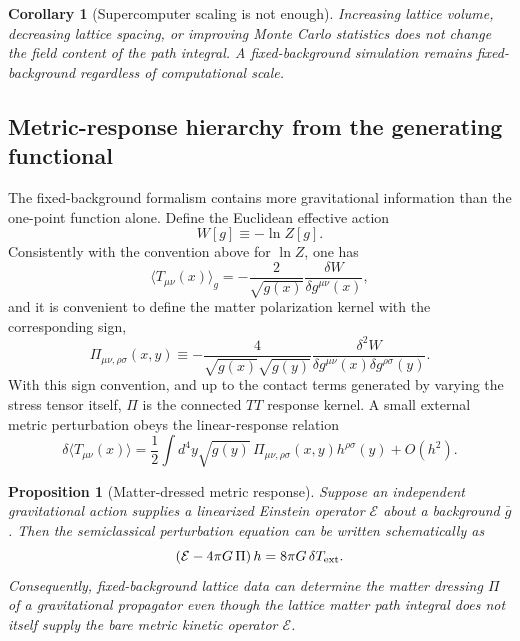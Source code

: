 \documentclass[11pt]{article}
\newtheorem{proposition}{Proposition}
\newtheorem{corollary}{Corollary}
\theoremstyle{remark}
\begin{document}
\begin{corollary}[Supercomputer scaling is not enough]
Increasing lattice volume, decreasing lattice spacing, or improving Monte Carlo statistics does not change the field content of the path integral. A fixed-background simulation remains fixed-background regardless of computational scale.
\end{corollary}


\subsection{Metric-response hierarchy from the generating functional}
The fixed-background formalism contains more gravitational information than the one-point function alone. Define the Euclidean effective action
\begin{equation}
 W[g]\equiv-\ln Z[g].
\end{equation}
Consistently with the convention above for $\ln Z$, one has
\begin{equation}
 \langle T_{\mu\nu}(x)\rangle_g
 =-\frac{2}{\sqrt{g(x)}}\frac{\delta W}{\delta g^{\mu\nu}(x)},
 \label{eq:lqcd-onepoint}
\end{equation}
and it is convenient to define the matter polarization kernel with the corresponding sign,
\begin{equation}
 \Pi_{\mu\nu,\rho\sigma}(x,y)
 \equiv
 -\frac{4}{\sqrt{g(x)}\sqrt{g(y)}}
 \frac{\delta^2W}
 {\delta g^{\mu\nu}(x)\delta g^{\rho\sigma}(y)}.
 \label{eq:lqcd-polarization}
\end{equation}
With this sign convention, and up to the contact terms generated by varying the stress tensor itself, $\Pi$ is the connected $TT$ response kernel. A small external metric perturbation obeys the linear-response relation
\begin{equation}
 \delta\langle T_{\mu\nu}(x)\rangle
 =\frac12\int d^4y\sqrt{g(y)}\,
 \Pi_{\mu\nu,\rho\sigma}(x,y)h^{\rho\sigma}(y)
 +O(h^2).
 \label{eq:lqcd-linear-response}
\end{equation}

\begin{proposition}[Matter-dressed metric response]
Suppose an independent gravitational action supplies a linearized Einstein operator $\mathcal E$ about a background $\bar g$. Then the semiclassical perturbation equation can be written schematically as
\begin{equation}
 \left(\mathcal E-4\pi G\,\Pi\right)h
 =8\pi G\,\delta T_{\rm ext}.
 \label{eq:dressed-gravity-response}
\end{equation}
Consequently, fixed-background lattice data can determine the matter dressing $\Pi$ of a gravitational propagator even though the lattice matter path integral does not itself supply the bare metric kinetic operator $\mathcal E$.
\end{proposition}
\end{document}
